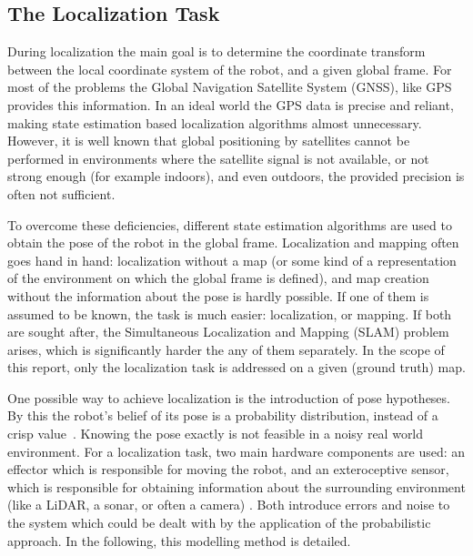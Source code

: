 \subsection{The Localization Task}

During localization the main goal is to determine the coordinate transform between the local coordinate system of the robot,
and a given global frame.
For most of the problems the Global Navigation Satellite System (GNSS), like GPS provides
this information.
In an ideal world the GPS data is precise and reliant, making state estimation based localization algorithms almost unnecessary.
However, it is well known that global positioning by satellites cannot be performed in environments
where the satellite signal is not available, or not strong enough
(for example indoors), and even outdoors, the provided precision is often not sufficient.

To overcome these deficiencies, different state estimation algorithms are used to obtain the pose of the robot in the global frame.
Localization and mapping often goes hand in hand: localization without a map
(or some kind of a representation of the environment on which the global frame is defined),
and map creation without the information about the pose is hardly possible.
If one of them is assumed to be known, the task is much easier: localization, or mapping.
If both are sought after, the Simultaneous Localization and Mapping (SLAM) problem arises,
which is significantly harder the any of them separately.
In the scope of this report, only the localization task is addressed on a given (ground truth) map.

One possible way to achieve localization is the introduction of pose hypotheses.
By this the robot's belief of its pose is a probability distribution, instead of a crisp value~\cite{Thrun2005}.
Knowing the pose exactly is not feasible in a noisy real world environment.
For a localization task, two main hardware components are used: an effector which is responsible for moving the robot,
and an exteroceptive sensor, which is responsible for obtaining information about the surrounding environment (like a LiDAR, a sonar, or often a camera)
\cite{Siegwart2011}.
Both introduce errors and noise to the system which could be dealt with by the application of the probabilistic approach.
In the following, this modelling method is detailed.

